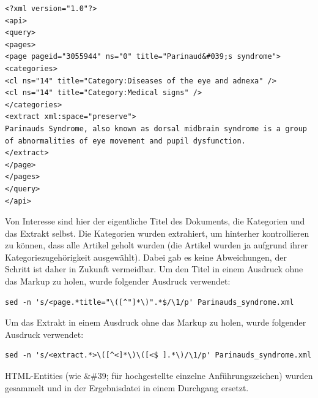 \documentclass[pagesize,DIV=calc,12pt,draft]{scrreprt}
\begin{document}
\lstset{
language=XML
}

\begin{lstlisting}
<?xml version="1.0"?>
<api>
<query>
<pages>
<page pageid="3055944" ns="0" title="Parinaud&#039;s syndrome">
<categories>
<cl ns="14" title="Category:Diseases of the eye and adnexa" />
<cl ns="14" title="Category:Medical signs" />
</categories>
<extract xml:space="preserve">
Parinauds Syndrome, also known as dorsal midbrain syndrome is a group of abnormalities of eye movement and pupil dysfunction.
</extract>
</page>
</pages>
</query>
</api>
\end{lstlisting}

Von Interesse sind hier der eigentliche Titel des Dokuments, die Kategorien und das Extrakt selbst. 
Die Kategorien wurden extrahiert, um hinterher kontrollieren zu können, dass alle Artikel geholt wurden (die Artikel wurden ja aufgrund ihrer Kategoriezugehörigkeit ausgewählt). 
Dabei gab es keine Abweichungen, der Schritt ist daher in Zukunft vermeidbar. 
Um den Titel in einem Ausdruck ohne das Markup zu holen, wurde folgender Ausdruck verwendet: 

\lstset{
language=bash
}

\begin{lstlisting}
sed -n 's/<page.*title="\([^"]*\)".*$/\1/p' Parinauds_syndrome.xml
\end{lstlisting}

Um das Extrakt in einem Ausdruck ohne das Markup zu holen, wurde
folgender Ausdruck verwendet:

\begin{lstlisting}
sed -n 's/<extract.*>\([^<]*\)\([<$ ].*\)/\1/p' Parinauds_syndrome.xml
\end{lstlisting}

HTML-Entities (wie \&\#39; für hochgestellte einzelne Anführungszeichen) wurden gesammelt und in der Ergebnisdatei in einem Durchgang ersetzt.
\end{document}
